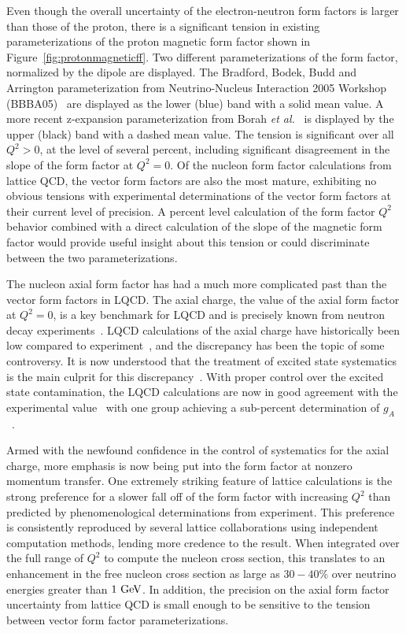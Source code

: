 Even though the overall uncertainty of the electron-neutron form factors is larger than those of the proton, there is a significant tension in existing parameterizations of the proton magnetic form factor
shown in Figure~\ref{fig:protonmagneticff}.
Two different parameterizations of the form factor, normalized by the dipole are displayed.
The Bradford, Bodek, Budd and Arrington parameterization from Neutrino-Nucleus Interaction 2005 Workshop (BBBA05)~\cite{Bradford:2006yz} are displayed as the lower (blue) band with a solid mean value.
A more recent z-expansion parameterization from Borah {\it et al.}~\cite{Borah:2020gte} is displayed by the upper (black) band with a dashed mean value.
The tension is significant over all $Q^2 > 0$, at the level of several percent,
including significant disagreement in the slope of the form factor at $Q^2 = 0$.
Of the nucleon form factor calculations from lattice QCD,
the vector form factors are also the most mature,
exhibiting no obvious tensions with experimental determinations
of the vector form factors at their current level of precision.
A percent level calculation of the form factor $Q^2$ behavior combined with a direct calculation of the slope of the magnetic form factor would provide useful insight about this tension or could discriminate
between the two parameterizations.


The nucleon axial form factor has had a much more complicated past than the vector form factors in LQCD.
The axial charge, the value of the axial form factor at $Q^2=0$, is a key benchmark for LQCD and is precisely known
from neutron decay experiments~.
LQCD calculations of the axial charge have historically been low compared to experiment~, and the discrepancy has been the topic of some controversy.
It is now understood that the treatment of excited state systematics is the main culprit for this discrepancy~\cite{Bar:2017kxh,Ottnad:2020qbw,Aoki:2021kgd}.
With proper control over the excited state contamination, the LQCD calculations are now in good agreement with the experimental value~ with one group achieving a sub-percent determination of $g_A$~\cite{Chang:2018uxx,Berkowitz:2018gqe,Walker-Loud:2019cif}.


Armed with the newfound confidence in the control of systematics for the axial charge,
more emphasis is now being put into the form factor at nonzero momentum transfer.
One extremely striking feature of lattice calculations is the strong preference for a slower
fall off of the form factor with increasing $Q^2$ than predicted by phenomenological determinations from experiment.
This preference is consistently reproduced by several lattice collaborations using
independent computation methods, lending more credence to the result.
When integrated over the full range of $Q^2$ to compute the nucleon cross section,
this translates to an enhancement in the free nucleon cross section as large as $30-40\%$
over neutrino energies greater than $1~{\rm GeV}$.
In addition, the precision on the axial form factor uncertainty from lattice QCD
is small enough to be sensitive to the tension between vector form factor parameterizations.


